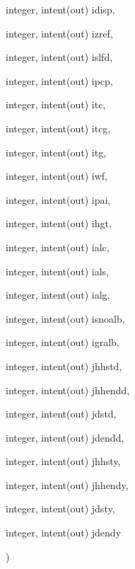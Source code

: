 {\begin{DoxyParamCaption}
\item[{integer, intent(out)}]{idisp, }
\item[{integer, intent(out)}]{izref, }
\item[{integer, intent(out)}]{islfd, }
\item[{integer, intent(out)}]{ipcp, }
\item[{integer, intent(out)}]{itc, }
\item[{integer, intent(out)}]{itcg, }
\item[{integer, intent(out)}]{itg, }
\item[{integer, intent(out)}]{iwf, }
\item[{integer, intent(out)}]{ipai, }
\item[{integer, intent(out)}]{ihgt, }
\item[{integer, intent(out)}]{ialc, }
\item[{integer, intent(out)}]{ials, }
\item[{integer, intent(out)}]{ialg, }
\item[{integer, intent(out)}]{isnoalb, }
\item[{integer, intent(out)}]{igralb, }
\item[{integer, intent(out)}]{jhhstd, }
\item[{integer, intent(out)}]{jhhendd, }
\item[{integer, intent(out)}]{jdstd, }
\item[{integer, intent(out)}]{jdendd, }
\item[{integer, intent(out)}]{jhhsty, }
\item[{integer, intent(out)}]{jhhendy, }
\item[{integer, intent(out)}]{jdsty, }
\item[{integer, intent(out)}]{jdendy}
\end{DoxyParamCaption}
)}\label{read__from__job__options_8f90_a59635532072b59aa5db6bd717cebb79b}

